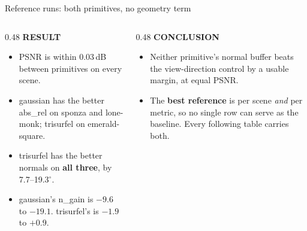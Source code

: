 \documentclass[aspectratio=169,9pt]{beamer}
\makeatletter
\newcommand{\up}[1]{\textcolor{good}{#1}}
\newcommand{\dn}[1]{\textcolor{bad}{#1}}
\newcommand{\code}[1]{{\ttfamily\fontsize{0.92\f@size}{\f@baselineskip}\selectfont #1}}
\newcommand{\lbl}[1]{\textcolor{lblcol}{\scriptsize\bfseries #1}\hspace{0.5em}}
\newcommand{\res}{\lbl{RESULT}}
\newcommand{\conc}{\lbl{CONCLUSION}}
\makeatother
\begin{document}
\begin{frame}{Reference runs: both primitives, no geometry term}
  \begin{center}\scriptsize
    
  \end{center}
  \vspace{0.4em}
  \begin{columns}[T]
    \begin{column}{0.48\textwidth}\small
      \res
      \begin{itemize}
        \item PSNR is within 0.03\,dB between primitives on every scene.
        \item \code{gaussian} has the better \code{abs\_rel} on \code{sponza} and
              \code{lone-monk}; \code{trisurfel} on \code{emerald-square}.
        \item \code{trisurfel} has the better normals on \textbf{all three}, by
              7.7--19.3$^\circ$.
        \item \code{gaussian}'s \code{n\_gain} is \dn{$-9.6$ to $-19.1$}. \code{trisurfel}'s is
              \dn{$-1.9$} to \up{$+0.9$}.
      \end{itemize}
    \end{column}
    \begin{column}{0.48\textwidth}\small
      \conc
      \begin{itemize}
        \item Neither primitive's normal buffer beats the view-direction control by a usable
              margin, at equal PSNR.
        \item The \textbf{best reference} is per scene \emph{and} per metric, so no single row
              can serve as the baseline. Every following table carries both.
      \end{itemize}
    \end{column}
  \end{columns}
\end{frame}
\end{document}
